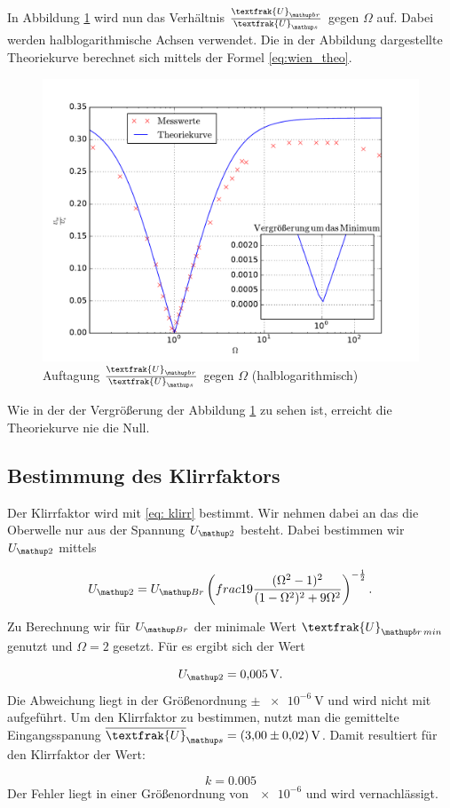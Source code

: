 In Abbildung \ref{fig: plot}
wird nun das Verhältnis $\frac{\textfrak{U}\ua{br}}{\textfrak{U}\ua{s}}$ 
gegen $\Omega$ auf. Dabei werden halblogarithmische Achsen verwendet.
Die in der Abbildung dargestellte Theoriekurve berechnet sich mittels der Formel 
\eqref{eq:wien_theo}.

\begin{figure}
  \centering
  \includegraphics[width=1\textwidth]{pics/ub_us.pdf}
  \caption{Auftagung $\frac{\textfrak{U}\ua{br}}{\textfrak{U}\ua{s}}$  gegen $\Omega$ (halblogarithmisch) }
  \label{fig: plot}
\end{figure}

Wie in der der Vergrößerung der Abbildung \ref{fig: plot} zu sehen ist, erreicht die 
Theoriekurve nie die Null.

\subsection{Bestimmung des Klirrfaktors}

Der Klirrfaktor wird mit \eqref{eq: klirr} bestimmt.
Wir nehmen dabei an das die Oberwelle nur aus der Spannung $U\ua{2}$ besteht.
Dabei bestimmen wir $U\ua{2}$ mittels

\begin{equation*}
 U\ua{2}=U\ua{Br}\left(frac{1}{9} \frac{(\Omega^2 - 1)^2 }{(1 - \Omega ^2)^2 + 9 \Omega ^2}\right)^{-\frac{1}{2}}.
\end{equation*}

Zu Berechnung wir für $U\ua{Br}$ der minimale Wert $\textfrak{U}\ua{br\,min}$
genutzt und $\Omega=2$ gesetzt.
Für es ergibt sich der Wert

\begin{equation*}
 U\ua{2}=\SI{0.005}{\volt}.
\end{equation*}
Die Abweichung liegt in der Größenordnung $\pm \, \SI{e-6}{\volt}$ und 
wird nicht mit aufgeführt.
Um den Klirrfaktor zu bestimmen, nutzt man die gemittelte Eingangsspanung 
$\overline{\textfrak{U}}\ua{s}=\SI{3.0\pm0.02}{\volt}$.
Damit resultiert für den Klirrfaktor der Wert:

\begin{equation*}
k=0.005
\end{equation*}
Der Fehler liegt in einer Größenordnung von $\num{e-6}$ und wird vernachlässigt.
